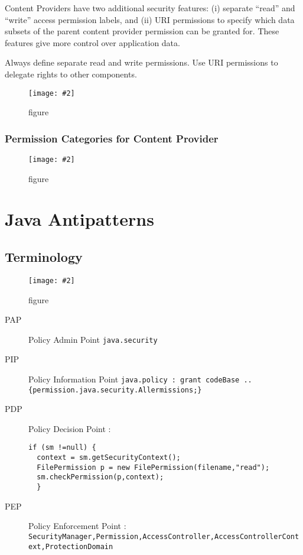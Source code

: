 \documentclass[a4paper,10pt]{scrreprt}
\newcommand{\pic}[2][figure]{\begin{figure}[h]
 \centering
 \texttt{[image: \#2]}
 \caption{#1}
\end{figure}
}
\begin{document}
Content Providers have two additional security features: (i) separate “read”
and “write” access permission labels, and (ii) URI permissions to specify which
data subsets of the parent content provider permission can be granted for.
These features give more control over application data.

\begin{framed}
 Always define separate read and write permissions. Use URI
permissions to delegate rights to other components.
\end{framed}
\pic{cpp.png}

\subsection{Permission Categories for Content Provider}
\pic{permcat.png}

\chapter{Java Antipatterns}
\section{Terminology}
\pic{javtermssec.png}
\begin{description}
 \item [PAP] Policy Admin Point \texttt{java.security}
 \item [PIP] Policy Information Point \texttt{java.policy : grant codeBase 
..\{permission.java.security.Allermissions;\}}
 \item [PDP] Policy Decision Point : \hfill \\
 \begin{lstlisting}[caption=PDP]
  if (sm !=null) {
  context = sm.getSecurityContext();
  FilePermission p = new FilePermission(filename,"read");
  sm.checkPermission(p,context);
  }
 \end{lstlisting}
\item [PEP] Policy Enforcement Point : 
\texttt{SecurityManager,Permission,AccessController,AccessControllerContext,ProtectionDomain}
\end{description}
\end{document}

